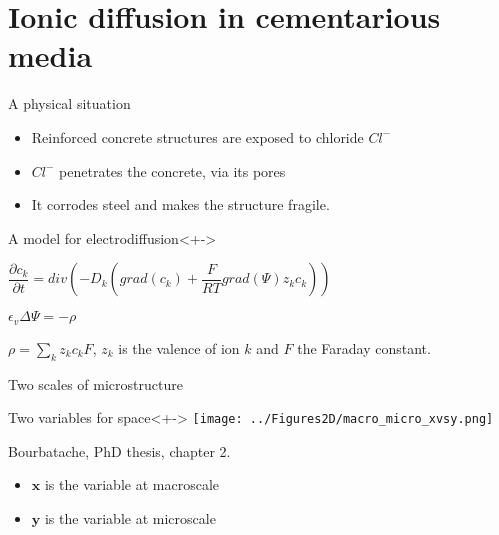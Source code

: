 \section{Ionic diffusion in cementarious media}

\begin{frame}
%
\begin{block}{A physical situation}
\begin{itemize}%
\item<+-> Reinforced concrete structures are exposed to chloride $Cl^-$
\item<+-> $Cl^-$ penetrates the concrete, via its pores
\item<+-> It corrodes steel and makes the structure fragile.
\end{itemize}
\end{block}
%
\begin{block}{A model for electrodiffusion}<+->
\begin{description}
\item<+-> [The Nernst-Planck equation] $\dfrac{\partial{c_k}}{\partial{t}}=div\left(-D_k\left(grad(c_k)+\dfrac{F}{RT}grad(\Psi)z_k c_k\right)\right)$
\item<+-> [Poisson equation] $\epsilon_v \Delta \Psi=-\rho$
\item<+-> [] $\displaystyle \rho=\sum\limits_k z_k c_k F$, $z_k$ is the valence of ion $k$ and $F$ the Faraday constant.
\end{description}
\end{block}
%
\end{frame}

\begin{frame}{Two scales of microstructure}
%
\begin{block}{Two variables for space}<+->
%
\texttt{[image: ../Figures2D/macro\_micro\_xvsy.png]}

\par
\tiny
Bourbatache, PhD thesis, chapter 2.
\normalsize
%
\begin{itemize}
\item<+-> $\mathbf{x}$ is the variable at macroscale
\item<+-> $\mathbf{y}$ is the variable at microscale
\end{itemize}
%
\end{block}
%
\end{frame}

